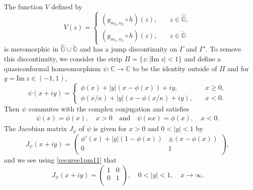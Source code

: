 \documentclass[12pt]{amsart}
\numberwithin{equation}{section}
\begin{document}
The function $V$ defined by
\begin{equation*}%
V(z)=\left\{
      \begin{array}{ll}
      (g_{m_2,n_2}\circ h)(z), & \quad z\in \hat{\mathbb{G}}, \\
      (g_{m_1,n_1}\circ h)(z), & \quad z\in \check{\mathbb{G}}
      \end{array}
    \right.
\end{equation*}
is meromorphic in $\hat{\mathbb{G}}\cup \check{\mathbb{G}}$ and has a jump discontinuity on $\Gamma$ and $\Gamma'$. To remove this discontinuity, we consider the strip $\Pi=\{z: |\text{Im}\ z|<1\}$ and define a quasiconformal homeomorphism $\psi: \mathbb{C}\to \mathbb{C}$ to be the identity outside of $\Pi$ and for $y=\text{Im}\ z \in (-1,1)$,
\begin{equation}\label{recuree1pm27  bef2}
\psi(x+iy)=\left\{
           \begin{array}{ll}
           \phi(x)+|y|(x-\phi(x))+iy,     & \quad x\geq 0, \\
           \phi(x/\kappa)+|y|(x-\phi(x/\kappa)+iy), & \quad x<0.
           \end{array}
           \right.
\end{equation}
Then $\psi$ commutes with the complex conjugation and satisfies
\begin{equation}\label{recuree1pm28}
\begin{split}
\psi(x)=\phi(x), \quad x>0 \quad \text{and} \quad \psi(\kappa x)=\phi(x), \quad x<0.
\end{split}
\end{equation}
The Jacobian matrix $J_{\psi}$ of $\psi$ is given for $x>0$ and $0<|y|<1$ by
\begin{equation*}%
J_{\psi}(x+iy)=\left(
                 \begin{array}{cc}
                 \phi'(x)+|y|(1-\phi(x)) & \pm(x-\phi(x)) \\
                 0 & 1 \\
                 \end{array}
               \right),
\end{equation*}
and we see using \eqref{recuree1pm11} that
\begin{equation*}%
J_{\psi}(x+iy)=\left(
                 \begin{array}{cc}
                 1 & 0 \\
                 0 & 1 \\
                 \end{array}
               \right), \quad 0<|y|<1, \quad x\to \infty.
\end{equation*}
\end{document}
